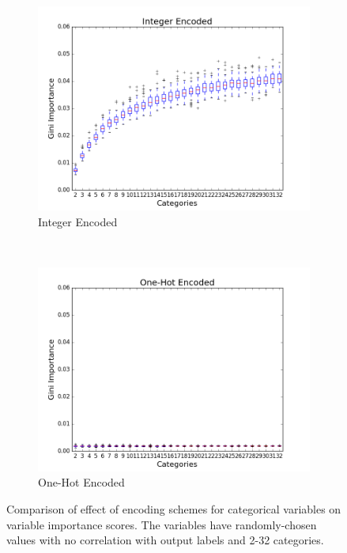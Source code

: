 \begin{figure}[H]
  \centering
  \begin{subfigure}[b]{0.45\textwidth}
    \includegraphics[width=\textwidth]{figures/random_forests/rf_bias_integer}
    \caption{Integer Encoded}
    \label{fig:integer}
  \end{subfigure}
  ~
  \begin{subfigure}[b]{0.45\textwidth}
    \includegraphics[width=\textwidth]{figures/random_forests/rf_bias_onehot}
    \caption{One-Hot Encoded}
    \label{fig:one-hot}
  \end{subfigure}
  \caption{Comparison of effect of encoding schemes for categorical variables on variable importance scores. The variables have randomly-chosen values with no correlation with output labels and 2-32 categories.}
  \label{fig:encoding-schemes}
\end{figure}

